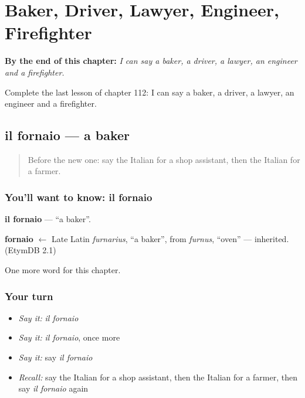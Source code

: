 
\chapter{Baker, Driver, Lawyer, Engineer, Firefighter}
\label{ch:it-baker-driver-lawyer-engineer-firefighter}

\begin{chapteropening}
\textbf{By the end of this chapter:} \emph{I can say a baker, a driver, a lawyer, an engineer and a firefighter.}

Complete the last lesson of chapter 112: I can say a baker, a driver, a lawyer, an engineer and a firefighter.
\end{chapteropening}

\section[il fornaio]{il fornaio — a baker}

\label{lesson:IT-C112-fornaio}



\begin{quote}
Before the new one: say the Italian for a shop assistant, then the Italian for a farmer.
\end{quote}

\subsection*{You'll want to know: il fornaio}
\textbf{il fornaio} — \textquotedblleft{}a baker\textquotedblright{}.

\begin{cousinweb}
\textbf{fornaio} $\leftarrow$ Late Latin \emph{furnarius}, \textquotedblleft{}a baker\textquotedblright{}, from \emph{furnus}, \textquotedblleft{}oven\textquotedblright{} — inherited. (EtymDB 2.1)
\end{cousinweb}

\begin{grammarlens}[title={What you've built}]
One more word for this chapter.
\end{grammarlens}

\subsection*{Your turn}
\begin{itemize}
\raggedright
  \item \emph{Say it:} \emph{il fornaio}
  \item \emph{Say it:} \emph{il fornaio}, once more
  \item \emph{Say it:} say \emph{il fornaio}
  \item \emph{Recall:} say the Italian for a shop assistant, then the Italian for a farmer, then say \emph{il fornaio} again
\end{itemize}

